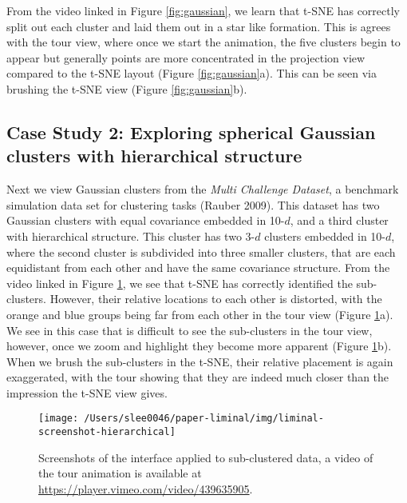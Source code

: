 \documentclass[article,notitle]{jdssv}
\begin{document}
From the video linked in Figure \ref{fig:gaussian}, we learn that t-SNE has
correctly split out each cluster and laid them out in a star like formation.
This is agrees with the tour view,
where once we start the animation, the five clusters begin to appear but
generally points are more concentrated in the projection view compared to
the t-SNE layout (Figure \ref{fig:gaussian}a).
This can be seen via brushing the t-SNE view (Figure \ref{fig:gaussian}b).

\hypertarget{case-study-2-exploring-spherical-gaussian-clusters-with-hierarchical-structure}{%
\subsection{Case Study 2: Exploring spherical Gaussian clusters with hierarchical structure}\label{case-study-2-exploring-spherical-gaussian-clusters-with-hierarchical-structure}}

Next we view Gaussian clusters from the
\emph{Multi Challenge Dataset}, a benchmark simulation data set for clustering tasks
(Rauber 2009). This dataset has two Gaussian clusters with equal covariance
embedded in 10-\(d\), and a third cluster
with hierarchical structure. This cluster has two 3-\(d\) clusters embedded in
10-\(d\), where the second cluster is subdivided into three smaller clusters,
that are each equidistant from each other and have the same covariance structure.
From the video linked in Figure \ref{fig:hierarchical}, we see
that t-SNE has correctly identified the sub-clusters. However, their relative
locations to each other is distorted, with the orange and blue groups being
far from each other in the tour view (Figure \ref{fig:hierarchical}a). We see
in this case that is difficult
to see the sub-clusters in the tour view, however, once we zoom and highlight
they become more apparent (Figure \ref{fig:hierarchical}b). When we brush
the sub-clusters in the t-SNE, their
relative placement is again exaggerated, with the tour showing that they
are indeed much closer than the impression the t-SNE view gives.



\begin{figure}

{\centering \texttt{[image: /Users/slee0046/paper-liminal/img/liminal-screenshot-hierarchical]} 

}

\caption{Screenshots of the  interface applied to sub-clustered data, a video of the tour animation is available at \url{https://player.vimeo.com/video/439635905}.}\label{fig:hierarchical}
\end{figure}
\end{document}
